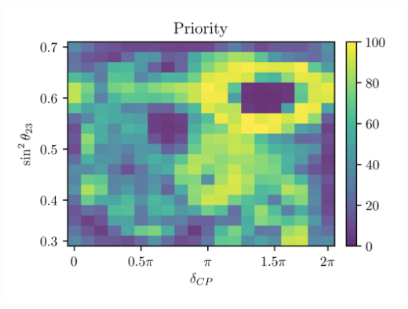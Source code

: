 \documentclass[9pt, aspectratio=169]{beamer}
\begin{document}
\begin{frame}
\begin{columns}
    \includegraphics[scale=0.6]{figures_final/priority_2d_sdcp_inverted.png}
  \end{columns}
\end{frame}
\end{document}
